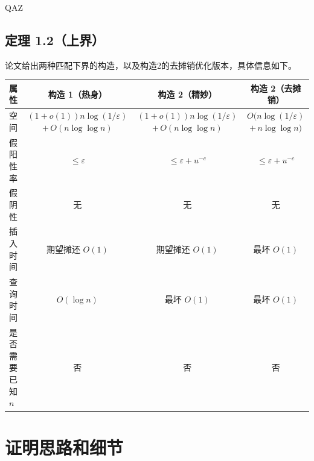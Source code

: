 QAZ\documentclass[UTF8,11pt,a4paper]{ctexart}
\begin{document}
\subsection{定理 1.2（上界）}
论文给出两种匹配下界的构造，以及构造2的去摊销优化版本，具体信息如下。
\begin{center}
\footnotesize
\renewcommand{\arraystretch}{1.25}
\setlength{\tabcolsep}{4pt}
\begin{tabular}{|l|c|c|c|}
\hline
\textbf{属性} & \textbf{构造 1（热身）} & \textbf{构造 2（精妙）} & \textbf{构造 2（去摊销）} \\
\hline
空间 & 
$(1+o(1))n\log(1/\varepsilon)$ 
\newline $+\,O(n\log\log n)$ 
& 
$(1+o(1))n\log(1/\varepsilon)$ 
\newline $+\,O(n\log\log n)$ 
& 
$O\bigl(n\log(1/\varepsilon)$ 
\newline $+\,n\log\log n\bigr)$ \\
\hline
假阳性率 & $\le\varepsilon$ & $\le\varepsilon+u^{-c}$ & $\le\varepsilon+u^{-c}$ \\
\hline
假阴性 & 无 & 无 & 无 \\
\hline
插入时间 & 期望摊还 $O(1)$ & 期望摊还 $O(1)$ & 最坏 $O(1)$ \\
\hline
查询时间 & $O(\log n)$ & 最坏 $O(1)$ & 最坏 $O(1)$ \\
\hline
是否需要已知 $n$ & 否 & 否 & 否 \\
\hline
\end{tabular}
\end{center}
\section{证明思路和细节}
\end{document}
